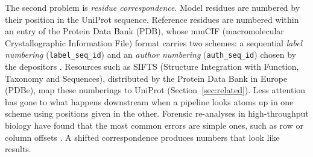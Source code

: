 \documentclass{article}
\begin{document}
The second problem is \emph{residue correspondence}. Model residues are
numbered by their position in the UniProt sequence. Reference residues are
numbered within an entry of the Protein Data Bank (PDB), whose mmCIF
(macromolecular Crystallographic Information File) format carries two
schemes: a sequential \emph{label numbering} (\texttt{label\_seq\_id}) and an
\emph{author numbering} (\texttt{auth\_seq\_id}) chosen by the depositors
\citep{westbrook2022,rcsbidentifiers,mmcifdict}. Resources such as SIFTS
(Structure Integration with Function, Taxonomy and Sequences), distributed by
the Protein Data Bank in Europe (PDBe), map these numberings to UniProt
(Section~\ref{sec:related}). Less attention has gone to what happens
downstream when a pipeline looks atoms up in one scheme using positions given
in the other. Forensic re-analyses in high-throughput biology have found that
the most common errors are simple ones, such as row or column offsets
\citep{baggerly2009}. A shifted correspondence produces numbers that look
like results.
\end{document}

